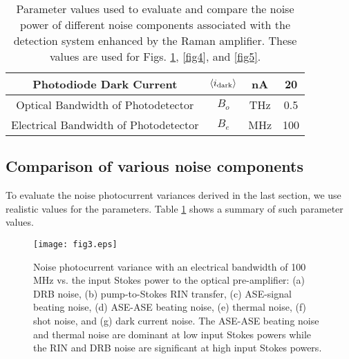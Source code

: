 \documentclass[10pt,letterpaper]{article}
\begin{document}
\begin{table}[t]
\begin{centering}
\begin{tabular}{|c|c|c|c|}
Photodiode Dark Current & $\left\langle i_{\rm dark}\right\rangle$ & nA & 20 \\ \hline
Optical Bandwidth of Photodetector & $B_o$ & THz & 0.5 \\ \hline
Electrical Bandwidth of Photodetector & $B_e$ & MHz & 100 \\ \hline
\end{tabular}
\caption{Parameter values used to evaluate and compare the noise power of different noise components associated with the detection system enhanced by the Raman amplifier. These values are used for Figs. \ref{fig3}, \ref{fig4}, and \ref{fig5}.}
\label{table1}
\end{centering}
\end{table}

\subsection{Comparison of various noise components}

To evaluate the noise photocurrent variances derived in the last section, we use realistic values for the parameters. Table \ref{table1} shows a summary of such parameter values. 

\begin{figure}[t]
\centering\texttt{[image: fig3.eps]}
\caption{Noise photocurrent variance with an electrical bandwidth of 100 MHz vs. the input Stokes power to the optical pre-amplifier: (a) DRB noise, (b) pump-to-Stokes RIN transfer, (c) ASE-signal beating noise, (d) ASE-ASE beating noise, (e) thermal noise, (f) shot noise, and (g) dark current noise. The ASE-ASE beating noise and thermal noise are dominant at low input Stokes powers while the RIN and DRB noise are significant at high input Stokes powers.}
\label{fig3}
\end{figure}
\end{document}
